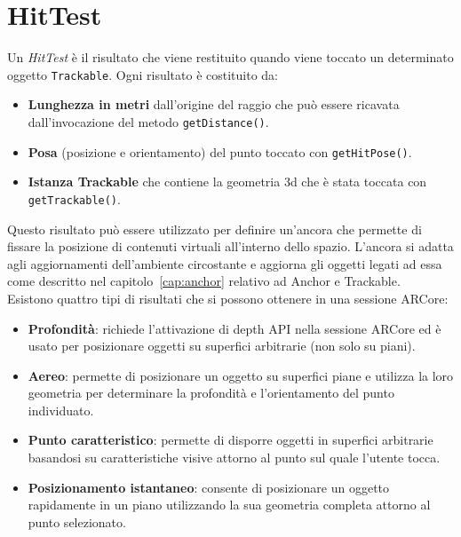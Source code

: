 \documentclass[crop=false, class=book]{standalone}
\begin{document}
	\chapter{HitTest}
	
	Un \textit{HitTest} è il risultato che viene restituito quando viene toccato un determinato oggetto \verb|Trackable|.
	Ogni risultato è costituito da:
	\begin{itemize}
		\item \textbf{Lunghezza in metri} dall'origine del raggio che può essere ricavata dall'invocazione del metodo \verb|getDistance()|.
		\item \textbf{Posa} (posizione e orientamento) del punto toccato con \verb|getHitPose()|.
		\item \textbf{Istanza Trackable} che contiene la geometria 3d che è stata toccata con \verb|getTrackable()|.
	\end{itemize}
	
	\noindent
	Questo risultato può essere utilizzato per definire un'ancora che permette di fissare la posizione di contenuti virtuali all'interno dello spazio. L'ancora si adatta agli aggiornamenti dell'ambiente circostante e aggiorna gli oggetti legati ad essa come descritto nel capitolo~\vref{cap:anchor} relativo ad Anchor e Trackable.\\
	
	\noindent
	Esistono quattro tipi di risultati che si possono ottenere in una sessione ARCore:
		\begin{itemize}
		\item \textbf{Profondità}: richiede l'attivazione di depth API nella sessione ARCore ed è usato per posizionare oggetti su superfici arbitrarie (non solo su piani).
		\item \textbf{Aereo}: permette di posizionare un oggetto su superfici piane e utilizza la loro geometria per determinare la profondità e l'orientamento del punto individuato.
		\item \textbf{Punto caratteristico}: permette di disporre oggetti in superfici arbitrarie basandosi su caratteristiche visive attorno al punto sul quale l'utente tocca. 
		\item \textbf{Posizionamento istantaneo}: consente di posizionare un oggetto rapidamente in un piano utilizzando la sua geometria completa attorno al punto selezionato. 
	\end{itemize}
	\clearpage
	
\end{document}

